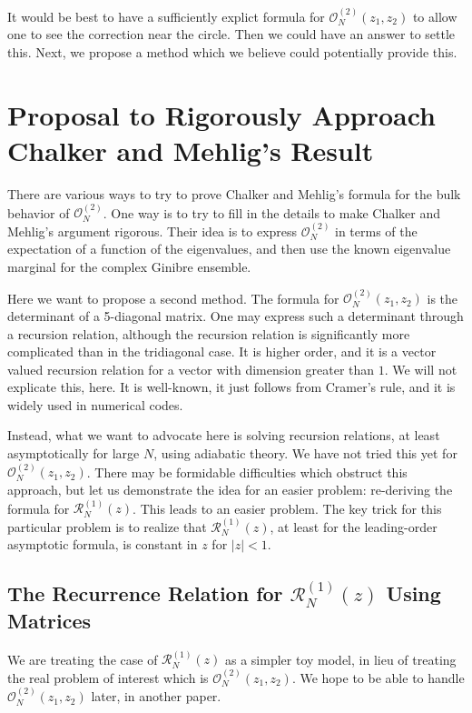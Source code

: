 \documentclass[12pt]{report}
\theoremstyle{definition}
\begin{document}
It would be best to have a sufficiently explict formula for $\mathcal{O}_N^{(2)}(z_1,z_2)$ to allow one to see the correction near the circle.
Then we could have an answer to settle this.
Next, we propose a method which we believe could potentially provide this.

\section{Proposal to Rigorously Approach Chalker and Mehlig's Result}
There are various ways to try to prove Chalker and Mehlig's formula for the bulk behavior of $\mathcal{O}_N^{(2)}$.
One way is to try to fill in the details to make Chalker and Mehlig's argument rigorous.
Their idea is to express $\mathcal{O}_N^{(2)}$ in terms of the expectation of a function of the eigenvalues, and then use the known eigenvalue marginal
for the complex Ginibre ensemble.

Here we want to propose a second method.
The formula for $\mathcal{O}_N^{(2)}(z_1,z_2)$ is the determinant of a 5-diagonal matrix.
One may express such a determinant through a recursion relation, although the recursion relation is significantly more complicated than in the tridiagonal case.
It is higher order, and it is a vector valued recursion relation for a vector with dimension greater than $1$.
We will not explicate this, here.
It is well-known, it just follows from Cramer's rule, and it is widely used in numerical codes.

Instead, what we want to advocate here is solving recursion relations, at least asymptotically for large $N$, using adiabatic theory.
We have not tried this yet for $\mathcal{O}_N^{(2)}(z_1,z_2)$.
There may be formidable difficulties which obstruct this approach, but let us demonstrate the idea for an easier problem: re-deriving the formula for $\mathcal{R}_N^{(1)}(z)$.
This leads to an easier problem.
The key trick for this particular problem is to realize that $\mathcal{R}_N^{(1)}(z)$, at least for the leading-order asymptotic formula,
is constant in $z$ for $|z|<1$.

\subsection{The Recurrence Relation for $\mathcal{R}_N^{(1)}(z)$ Using Matrices}

We are treating the case of $\mathcal{R}_N^{(1)}(z)$ as a simpler toy model,
in lieu of treating the real problem of interest which is $\mathcal{O}_N^{(2)}(z_1,z_2)$.
We hope to be able to handle $\mathcal{O}_N^{(2)}(z_1,z_2)$ later, in another paper.
\end{document}

